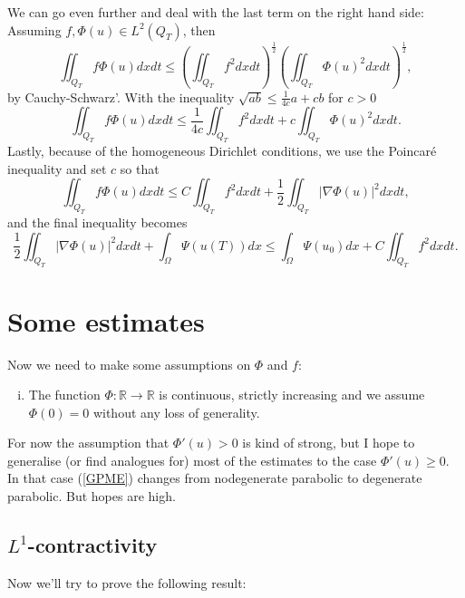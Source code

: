 \documentclass[11pt, a4paper]{article}
\begin{document}
\begin{obs}
We can go even further and deal with the last term on the right hand side: Assuming $f,\Phi(u) \in L^2(Q_T)$, then
\begin{equation*}
\iint_{Q_T} f\Phi(u)dxdt \leq \left(\iint_{Q_T} f^2 dxdt\right)^\frac{1}{2}\left(\iint_{Q_T} \Phi(u)^2 dxdt\right)^\frac{1}{2},
\end{equation*}
by Cauchy-Schwarz'. With the inequality $\sqrt{ab} \leq \frac{1}{4c}a + cb$ for $c>0$
\begin{equation*}
\iint_{Q_T} f\Phi(u)dxdt \leq \frac{1}{4c}\iint_{Q_T}f^2dxdt + c\iint_{Q_T}\Phi(u)^2dxdt.
\end{equation*}
Lastly, because of the homogeneous Dirichlet conditions, we use the Poincaré inequality and set $c$ so that
\begin{equation}
\label{using_Poincare}
\iint_{Q_T} f\Phi(u)dxdt \leq C\iint_{Q_T}f^2dxdt + \frac{1}{2}\iint_{Q_T}|\nabla \Phi(u)|^2dxdt,
\end{equation}
and the final inequality becomes
\begin{equation}
\frac{1}{2}\iint_{Q_T}|\nabla \Phi(u)|^2dxdt + \int_\Omega \Psi(u(T))dx \leq \int_\Omega \Psi(u_0)dx + C\iint_{Q_T}f^2dxdt.
\end{equation}
\end{obs}
\section{Some estimates}
Now we need to make some assumptions on $\Phi$ and $f$:
\begin{enumerate}[i)]
	\item The function $\Phi: \mathbb{R} \to \mathbb{R}$ is continuous, strictly increasing and we assume $\Phi(0) = 0$ without any loss of generality.
\end{enumerate}

For now the assumption that $\Phi'(u) > 0$ is kind of strong, but I hope to generalise (or find analogues for) most of the estimates to the case $\Phi'(u) \geq 0$. In that case (\ref{GPME}) changes from nodegenerate parabolic to degenerate parabolic. But hopes are high.

\subsection{$L^1$-contractivity}
Now we'll try to prove the following result:
\end{document}
